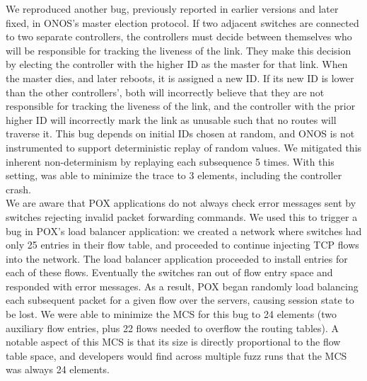  We reproduced another bug,
previously reported in earlier versions and later fixed, in
ONOS's master election protocol. If two adjacent switches are connected to two
separate controllers, the controllers must decide between themselves who will
be responsible for tracking the liveness of the link. They make this decision
by electing the controller with the higher ID as the master for that link.
When the master dies, and later reboots, it is assigned a new ID. If
its new ID is lower than the other controllers', both will incorrectly
believe that they are not responsible for tracking the liveness of the link,
and the controller with the prior higher ID will incorrectly mark the link as
unusable such that no routes will traverse it. This bug depends on
initial IDs chosen at random, and ONOS is not instrumented to
support deterministic replay of random values. We mitigated this
inherent non-determinism by replaying each subsequence 5 times. With this setting,
\projectname{} was able to minimize the trace to 3 elements, including
the controller crash.\\[0.5ex]
 We are aware that POX
applications do not always check error messages sent by switches
rejecting invalid packet forwarding commands. We used this to trigger a bug in
POX's load balancer application: we created a network where switches had only
25 entries in their flow table, and proceeded to continue injecting TCP flows
into the network. The load balancer application proceeded to install entries
for each of these flows. Eventually the switches ran out of flow entry
space and responded with error messages. As a result, POX began randomly load
balancing each subsequent packet for a given flow over the servers, causing
session state to be lost. We were able to minimize the MCS for this
bug to 24 elements (two auxiliary flow entries, plus 22 flows needed to
overflow the routing tables). A notable aspect of this MCS is that its
size is directly proportional to the flow table space, and developers would
find across multiple fuzz runs that the MCS was always 24
elements.

